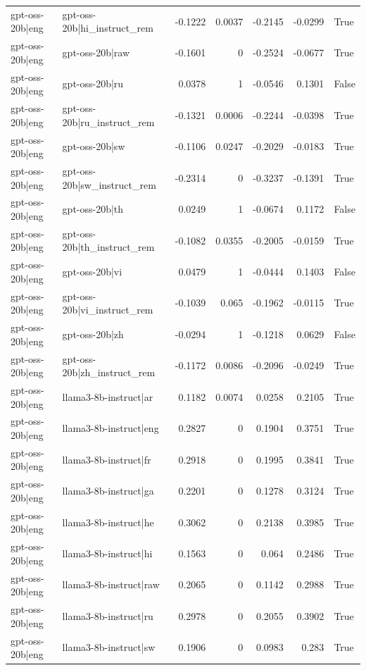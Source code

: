 \begin{table}
\begin{tabular}{l l r r r r l}
gpt-oss-20b|eng & gpt-oss-20b|hi_instruct_rem & -0.1222 & 0.0037 & -0.2145 & -0.0299 & True \\
gpt-oss-20b|eng & gpt-oss-20b|raw & -0.1601 & 0 & -0.2524 & -0.0677 & True \\
gpt-oss-20b|eng & gpt-oss-20b|ru & 0.0378 & 1 & -0.0546 & 0.1301 & False \\
gpt-oss-20b|eng & gpt-oss-20b|ru_instruct_rem & -0.1321 & 0.0006 & -0.2244 & -0.0398 & True \\
gpt-oss-20b|eng & gpt-oss-20b|sw & -0.1106 & 0.0247 & -0.2029 & -0.0183 & True \\
gpt-oss-20b|eng & gpt-oss-20b|sw_instruct_rem & -0.2314 & 0 & -0.3237 & -0.1391 & True \\
gpt-oss-20b|eng & gpt-oss-20b|th & 0.0249 & 1 & -0.0674 & 0.1172 & False \\
gpt-oss-20b|eng & gpt-oss-20b|th_instruct_rem & -0.1082 & 0.0355 & -0.2005 & -0.0159 & True \\
gpt-oss-20b|eng & gpt-oss-20b|vi & 0.0479 & 1 & -0.0444 & 0.1403 & False \\
gpt-oss-20b|eng & gpt-oss-20b|vi_instruct_rem & -0.1039 & 0.065 & -0.1962 & -0.0115 & True \\
gpt-oss-20b|eng & gpt-oss-20b|zh & -0.0294 & 1 & -0.1218 & 0.0629 & False \\
gpt-oss-20b|eng & gpt-oss-20b|zh_instruct_rem & -0.1172 & 0.0086 & -0.2096 & -0.0249 & True \\
gpt-oss-20b|eng & llama3-8b-instruct|ar & 0.1182 & 0.0074 & 0.0258 & 0.2105 & True \\
gpt-oss-20b|eng & llama3-8b-instruct|eng & 0.2827 & 0 & 0.1904 & 0.3751 & True \\
gpt-oss-20b|eng & llama3-8b-instruct|fr & 0.2918 & 0 & 0.1995 & 0.3841 & True \\
gpt-oss-20b|eng & llama3-8b-instruct|ga & 0.2201 & 0 & 0.1278 & 0.3124 & True \\
gpt-oss-20b|eng & llama3-8b-instruct|he & 0.3062 & 0 & 0.2138 & 0.3985 & True \\
gpt-oss-20b|eng & llama3-8b-instruct|hi & 0.1563 & 0 & 0.064 & 0.2486 & True \\
gpt-oss-20b|eng & llama3-8b-instruct|raw & 0.2065 & 0 & 0.1142 & 0.2988 & True \\
gpt-oss-20b|eng & llama3-8b-instruct|ru & 0.2978 & 0 & 0.2055 & 0.3902 & True \\
gpt-oss-20b|eng & llama3-8b-instruct|sw & 0.1906 & 0 & 0.0983 & 0.283 & True \\

\end{tabular}
\end{table}
